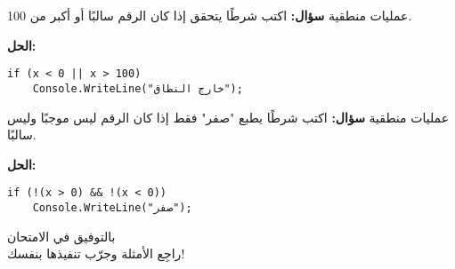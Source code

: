 \documentclass[12pt]{beamer}
\begin{document}
\begin{frame}[fragile]{عمليات منطقية}
\textbf{سؤال:}
اكتب شرطًا يتحقق إذا كان الرقم سالبًا أو أكبر من 100.

\pause
\textbf{الحل:}
\begin{lstlisting}[language={[Sharp]C}]
if (x < 0 || x > 100)
    Console.WriteLine("خارج النطاق");
\end{lstlisting}
\end{frame}

\begin{frame}[fragile]{عمليات منطقية}
\textbf{سؤال:}
اكتب شرطًا يطبع "صفر" فقط إذا كان الرقم ليس موجبًا وليس سالبًا.

\pause
\textbf{الحل:}
\begin{lstlisting}[language={[Sharp]C}]
if (!(x > 0) && !(x < 0))
    Console.WriteLine("صفر");
\end{lstlisting}
\end{frame}

\begin{frame}
\centering
بالتوفيق في الامتحان 🌟\\
راجِع الأمثلة وجرّب تنفيذها بنفسك!
\end{frame}
\end{document}
